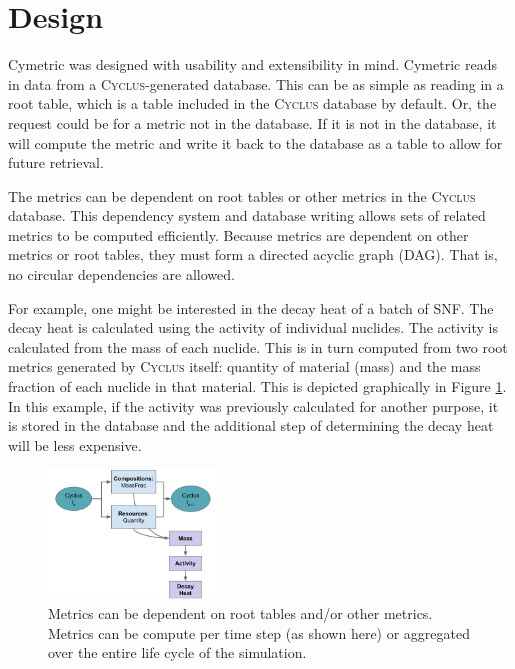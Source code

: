 \documentclass{anstrans}
\newcommand{\cyclus}{\textsc{Cyclus}\xspace}
\begin{document}
\section{Design}
Cymetric was designed with usability and extensibility in mind. 
Cymetric reads in data from a \cyclus{}-generated database. This can be as 
simple as reading in a root table, which is a table included in the \cyclus 
database by default. Or, the request could be for a metric not in the database.
If it is not in the database, it will compute the metric and 
write it back to the database as a table to allow for future retrieval. 

The metrics can be dependent on root tables or other metrics in the
\cyclus database. This dependency system and database writing allows sets of 
related metrics to be computed efficiently. Because metrics are dependent 
on other metrics or root tables, they must form a directed 
acyclic graph (DAG). That is, no circular dependencies are allowed.

For example, one might be interested in the decay heat 
of a batch of \gls{SNF}. The decay heat is calculated using the activity of 
individual nuclides. The activity is calculated from the mass of each nuclide.
This is in turn computed from two root metrics generated by 
\cyclus itself: quantity of material (mass) and the mass fraction of each 
nuclide in that material. This is depicted graphically in Figure \ref{fig:metdeps}. 
In this example, if the activity was previously calculated for another purpose, 
it is stored in the database and the additional step of determining the decay heat 
will be less expensive. 

\begin{figure}[htbp!]
\begin{centering}
\includegraphics[width=0.4\textwidth]{deps.pdf}
\end{centering}
\caption{Metrics can be dependent on root tables and/or other metrics.
         Metrics can be compute per time step (as shown here) or aggregated
         over the entire life cycle of the simulation.}
\label{fig:metdeps}
\end{figure}
\end{document}
